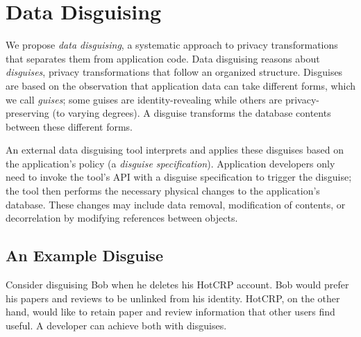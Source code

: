 \section{Data Disguising}

%
We propose \emph{data disguising}, a systematic approach to privacy
transformations that separates them from application code.
%
Data disguising reasons about \emph{disguises}, privacy transformations that
follow an organized structure.
%
Disguises are based on the observation that application data can take
different forms, which we call \emph{guises}; some guises are identity-revealing while others are
privacy-preserving (to varying degrees).
%
%
A disguise transforms the database contents between these different forms.
%
%
%
%

%
An external data disguising tool interprets and applies these disguises
based on the application's policy (a \emph{disguise specification}).
%
Application developers only need to invoke the tool's API with a disguise specification to trigger
the disguise; the tool then performs the necessary physical changes to the application's
database.
%
These changes may include data removal, modification of contents, or decorrelation by modifying
references between objects.
%

\subsection{An Example Disguise}
\label{design:eg}
%
Consider disguising Bob when he deletes his HotCRP account.
%
Bob would prefer his papers and reviews to be unlinked from his identity.
%
HotCRP, on the other hand, would like to retain paper and review information that other users
find useful.
%
A developer can achieve both with disguises.
%

